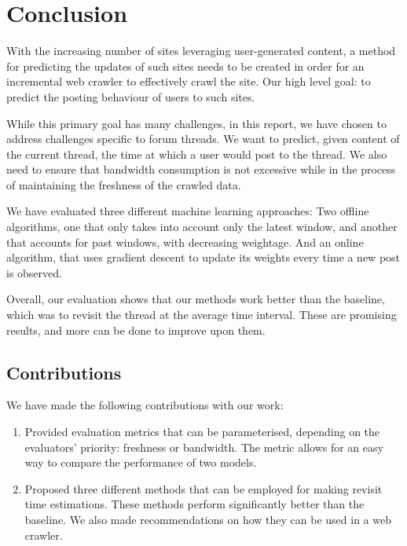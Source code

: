 \chapter{Conclusion}

With the increasing number of sites leveraging user-generated content, a method 
for predicting the updates of such sites needs to be created in order for an 
incremental web crawler to effectively crawl the site. Our high level goal: to 
predict the posting behaviour of users to such sites.

While this primary goal has many challenges, in this report, we have chosen to 
address challenges specific to forum threads. We want to predict, given content 
of the current thread, the time at which a user would post to the thread. We 
also need to ensure that bandwidth consumption is not excessive while in the 
process of maintaining the freshness of the crawled data.

We have evaluated three different machine learning approaches: Two offline 
algorithms, one that only takes into account only the latest window, and another 
that accounts for past windows, with decreasing weightage. And an online 
algorithm, that uses gradient descent to update its weights every time a new 
post is observed.

Overall, our evaluation shows that our methods work better than the baseline, 
which was to revisit the thread at the average time interval. These are 
promising results, and more can be done to improve upon them. 

\section{Contributions}
We have made the following contributions with our work:
\begin{enumerate}
	\item Provided evaluation metrics that can be parameterised, depending on 
the evaluators' priority: freshness or bandwidth. The metric allows for an easy 
way to compare the performance of two models.

	\item Proposed three different methods that can be employed for making 
revisit time estimations. These methods perform significantly better than the 
baseline.  We also made recommendations on how they can be used in a web 
crawler.
\end{enumerate}

